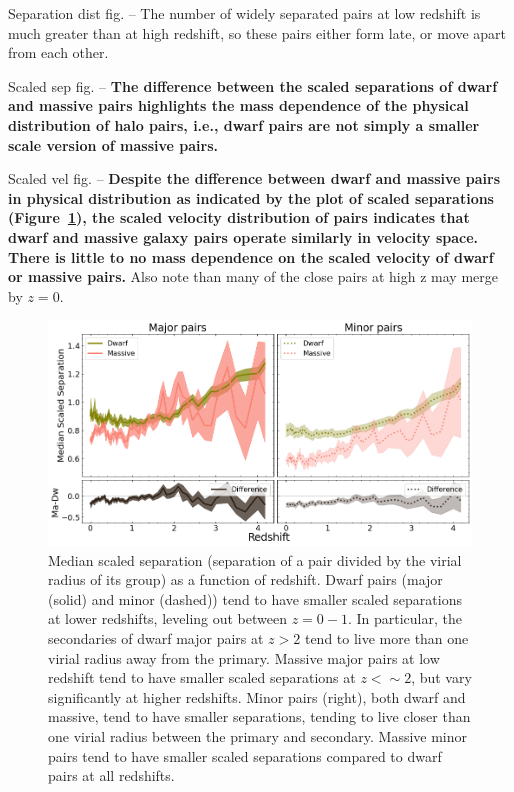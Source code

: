 \documentclass[twocolumn]{aastex631}
\begin{document}
Separation dist fig. -- The number of widely separated pairs at low redshift is much greater than at high redshift, so these pairs either form late, or move apart from each other. 

Scaled sep fig. -- \textbf{The difference between the scaled separations of dwarf and massive pairs highlights the mass dependence of the physical distribution of halo pairs, i.e., dwarf pairs are not simply a smaller scale version of massive pairs.}

Scaled vel fig. --   \textbf{Despite the difference between dwarf and massive pairs in physical distribution as indicated by the plot of scaled separations (Figure~\ref{fig:sep-scaled}), the scaled velocity distribution of pairs indicates that dwarf and massive galaxy pairs operate similarly in velocity space. There is little to no mass dependence on the scaled velocity of dwarf or massive pairs.}
Also note than many of the close pairs at high z may merge by $z=0$.

\begin{figure}[htp]
  \centering
  \includegraphics[width=\textwidth]{scaledsep_1000.png}
  \caption{Median scaled separation (separation of a pair divided by the virial radius of its group) as a function of redshift. Dwarf pairs (major (solid) and minor (dashed)) tend to have smaller scaled separations at lower redshifts, leveling out between $z=0-1$. In particular, the secondaries of dwarf major pairs at $z>2$ tend to live more than one virial radius away from the primary. Massive major pairs at low redshift tend to have smaller scaled separations  at $z<\sim2$, but vary significantly at higher redshifts. 
  Minor pairs (right), both dwarf and massive, tend to have smaller separations, tending to live closer than one virial radius between the primary and secondary. Massive minor pairs tend to have smaller scaled separations compared to dwarf pairs at all redshifts.
   
    }
  \label{fig:sep-scaled}
\end{figure}
\end{document}
